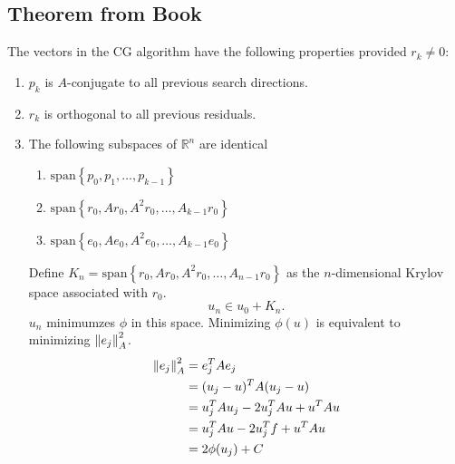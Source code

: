 \documentclass{article}
\newcommand{\Rl}{\mathbb{R}}
\begin{document}
        \subsection{Theorem from Book}
            The vectors in the CG algorithm have the following properties provided $r_k \neq 0$:
            \begin{enumerate}
                \item $p_k$ is $A$-conjugate to all previous search directions.
                \item $r_k$ is orthogonal to all previous residuals.
                \item The following subspaces of $\Rl^n$ are identical
                \begin{enumerate}
                    \item $\text{span}\left\{p_0,p_1,\dots,p_{k-1}\right\}$
                    \item $\text{span}\left\{r_0,Ar_0,A^2r_0,\dots,A_{k-1}r_0\right\}$
                    \item $\text{span}\left\{e_0,Ae_0,A^2e_0,\dots,A_{k-1}e_0\right\}$
                \end{enumerate}
                Define $K_n = \text{span}\left\{r_0,Ar_0,A^2r_0,\dots,A_{n-1}r_0\right\}$ as the $n$-dimensional Krylov space associated with $r_0$. $$u_n \in u_0 + K_n.$$ $u_n$ minimumzes $\phi$ in this space.  Minimizing $\phi(u)$ is equivalent to minimizing $\norm{e_j}_A^2$.
                \begin{align*}
                    \norm{e_j}_A^2 &= e_j^TAe_j \\
                    &= (u_j - u)^TA(u_j - u) \\
                    &= u_j^TAu_j - 2u_j^TAu + u^TAu \\
                    &= u_j^TAu - 2u_j^Tf + u^TAu \\
                    &= 2\phi(u_j) + C
                \end{align*}
            \end{enumerate}
\end{document}
